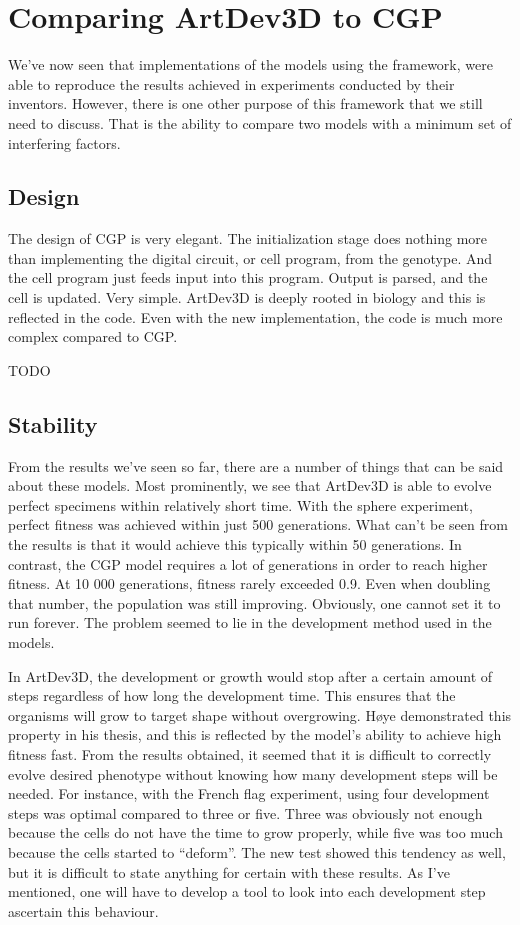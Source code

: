 \section{Comparing ArtDev3D to CGP}
We've now seen that implementations of the models using the framework, were able to reproduce the results achieved in experiments conducted by their inventors. However, there is one other purpose of this framework that we still need to discuss. That is the ability to compare two models with a minimum set of interfering factors.

\subsection{Design}
The design of CGP is very elegant. The initialization stage does nothing more than implementing the digital circuit, or cell program, from the genotype. And the cell program just feeds input into this program. Output is parsed, and the cell is updated. Very simple. ArtDev3D is deeply rooted in biology and this is reflected in the code. Even with the new implementation, the code is much more complex compared to CGP.

TODO


\subsection{Stability}
From the results we've seen so far, there are a number of things that can be said about these models. Most prominently, we see that ArtDev3D is able to evolve perfect specimens within relatively short time. With the sphere experiment, perfect fitness was achieved within just 500 generations. What can't be seen from the results is that it would achieve this typically within 50 generations. In contrast, the CGP model requires a lot of generations in order to reach higher fitness. At 10 000 generations, fitness rarely exceeded 0.9. Even when doubling that number, the population was still improving. Obviously, one cannot set it to run forever. The problem seemed to lie in the development method used in the models.

In ArtDev3D, the development or growth would stop after a certain amount of steps regardless of how long the development time. This ensures that the organisms will grow to target shape without overgrowing. H{\o}ye\cite{hoye2006} demonstrated this property in his thesis, and this is reflected by the model's ability to achieve high fitness fast. From the results obtained, it seemed that it is difficult to correctly evolve desired phenotype without knowing how many development steps will be needed. For instance, with the French flag experiment, using four development steps was optimal compared to three or five. Three was obviously not enough because the cells do not have the time to grow properly, while five was too much because the cells started to ``deform''. The new test showed this tendency as well, but it is difficult to state anything for certain with these results. As I've mentioned, one will have to develop a tool to look into each development step ascertain this behaviour.
